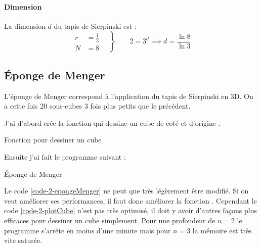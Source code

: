 		\paragraph{Dimension}
			La dimension $d$ du tapis de Sierpinski est :
			$$
				\left.\begin{aligned}
					r &= \frac{1}{3}	\quad	\\
					N &= 8	\quad
					\end{aligned}
				\right\}
				\qquad 2=3^d \implies d= \frac{\ln{8}}{\ln{3}}
			$$




	\subsection{Éponge de Menger}

		L'éponge de Menger correspond à l'application du tapis de Sierpinski en 3D. On a cette fois 20 sous-cubes 3 fois plus petits que le précédent.


		J'ai d'abord crée la fonction  qui dessine un cube de coté  et d'origine .
		\begin{listing}[H]
			\caption{Fonction pour dessiner un cube}
			\label{code-2-plotCube}
		\end{listing}
	


		Ensuite j'ai fait le programme suivant :
		\begin{listing}[H]
			\caption{Éponge de Menger}
			\label{code-2-epongeMenger}
		\end{listing}

		Le code \ref{code-2-epongeMenger} ne peut que très légèrement être modifié. Si on veut améliorer ses performances, il faut donc améliorer la fonction .
		Cependant le code \ref{code-2-plotCube} n'est pas très optimisé, il doit y avoir d'autres façons plus efficaces pour dessiner un cube simplement. Pour une profondeur de $n=2$ le programme s'arrête en moins d'une minute mais pour $n=3$ la mémoire est très vite saturée.

